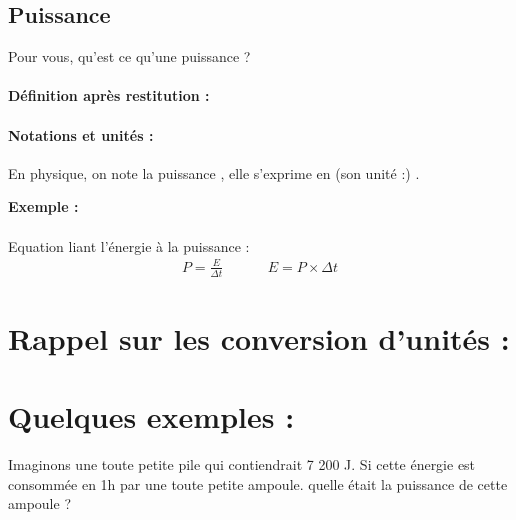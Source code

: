 \documentclass[a4paper]{article}
\newcommand{\parcoeur}{{\large\ding{164}} }
\newcommand{\afaire}{{\large\ding{46}} }
\begin{document}




\pagebreak
\subsection{Puissance}
 Pour vous, qu'est ce qu'une puissance ? 


\paragraph{Définition après restitution : }
\paragraph{Notations et unités : }En physique, on note la puissance , elle s'exprime en (son unité :) . 

\textbf{Exemple : }

\paragraph{\parcoeur}Equation liant l'énergie à la puissance : \begin{align}
    P = \frac{E}{\Delta t} &\hspace{1cm} 
    E=P\times \Delta t
\end{align}

\section{Rappel sur les conversion d'unités : }
\pagebreak
\section{Quelques exemples : }
Imaginons une toute petite pile qui contiendrait 7 200 J. Si cette énergie est consommée en 1h par une toute petite ampoule. quelle était la puissance de cette ampoule ? \\
\afaire {}
\end{document}
